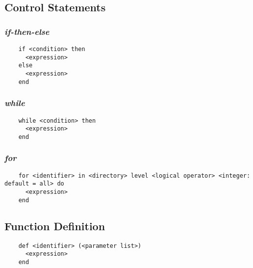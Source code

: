 \documentclass[11pt]{article}
\begin{document}
\newpage

\subsection{Control Statements}
\subsubsection{\emph{if-then-else}}
\begin{listing}[H]
  \begin{verbatim}
    if <condition> then
      <expression>
    else
      <expression>
    end
  \end{verbatim}
  \label{lst:the-code}
\end{listing}

\subsubsection{\emph{while}}
\begin{listing}[H]
  \begin{verbatim}
    while <condition> then
      <expression>
    end
  \end{verbatim}
  \label{lst:the-code}
\end{listing}

\subsubsection{\emph{for}}
\begin{listing}[H]
  \begin{verbatim}
    for <identifier> in <directory> level <logical operator> <integer: default = all> do
      <expression>
    end
  \end{verbatim}
  \label{lst:the-code}
\end{listing}
\subsection{Function Definition}
\begin{listing}[H]
  \begin{verbatim}
    def <identifier> (<parameter list>)
      <expression>
    end
  \end{verbatim}
  \label{lst:the-code}
\end{listing}
\end{document}
